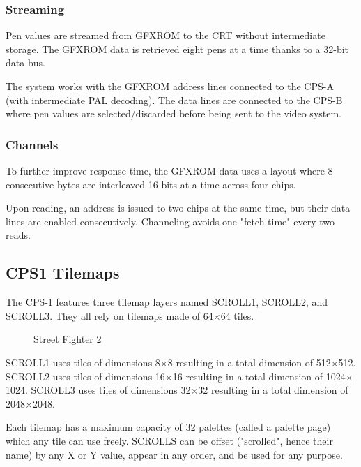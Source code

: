 \subsubsection{Streaming}
Pen values are streamed from GFXROM to the CRT without intermediate storage. The GFXROM data is retrieved eight pens at a time thanks to a 32-bit data bus.

The system works with the GFXROM address lines connected to the CPS-A (with intermediate PAL decoding). The data lines are connected to the CPS-B where pen values are selected/discarded before being sent to the video system.

 \begin{figure}[H]%
 \end{figure}%


\subsubsection{Channels}
To further improve response time, the GFXROM data uses a layout where 8 consecutive bytes are interleaved 16 bits at a time across four chips. 

Upon reading, an address is issued to two chips at the same time, but their data lines are enabled consecutively. Channeling avoids one "fetch time" every two reads.



\subsection{CPS1 Tilemaps}
The CPS-1 features three tilemap layers named SCROLL1, SCROLL2, and SCROLL3. They all rely on tilemaps made of 64$\times$64 tiles.


\vfill
\begin{figure}[!b]
 \caption*{Street Fighter 2}%
 \end{figure}%
\pagebreak

SCROLL1 uses tiles of dimensions 8$\times$8 resulting in a total dimension of 512$\times$512. SCROLL2 uses tiles of dimensions 16$\times$16 resulting in a total dimension of 1024$\times$1024. SCROLL3 uses tiles of dimensions 32$\times$32 resulting in a total dimension of 2048$\times$2048.

Each tilemap has a maximum capacity of 32 palettes (called a palette page) which any tile can use freely. SCROLLS can be offset ("scrolled", hence their name) by any X or Y value, appear in any order, and be used for any purpose.


